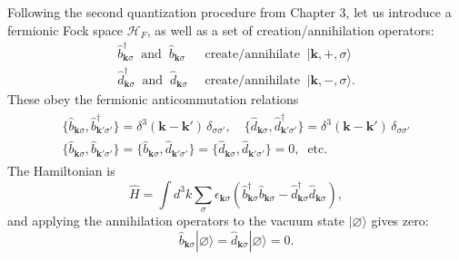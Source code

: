 \documentclass[pra,12pt]{revtex4}
\begin{document}
Following the second quantization procedure from Chapter 3, let us
introduce a fermionic Fock space $\mathscr{H}_F$, as well as a set of
creation/annihilation operators:
\begin{align*}
  \hat{b}_{\mathbf{k}\sigma}^\dagger \;\; \mathrm{and} \;\; \hat{b}_{\mathbf{k}\sigma}
  &\;\;\mathrm{create/annihilate} \;\; |\mathbf{k}, +, \sigma\rangle\\
  \hat{d}_{\mathbf{k}\sigma}^\dagger \;\; \mathrm{and} \;\; \hat{d}_{\mathbf{k}\sigma}
  &\;\;\mathrm{create/annihilate} \;\; |\mathbf{k}, -, \sigma\rangle.
\end{align*}
These obey the fermionic anticommutation relations
\begin{align}
  \begin{aligned}
    \{\hat{b}_{\mathbf{k}\sigma}, \hat{b}_{\mathbf{k}'\sigma'}^\dagger \}
    = \delta^3(\mathbf{k}-\mathbf{k}') \, \delta_{\sigma\sigma'}, \quad
    \{\hat{d}_{\mathbf{k}\sigma}, \hat{d}_{\mathbf{k}'\sigma'}^\dagger \}
    = \delta^3(\mathbf{k}-\mathbf{k}') \, \delta_{\sigma\sigma'} \\
    \{\hat{b}_{\mathbf{k}\sigma}, \hat{b}_{\mathbf{k}'\sigma'} \} = 
    \{\hat{b}_{\mathbf{k}\sigma}, \hat{d}_{\mathbf{k}'\sigma'} \} = 
    \{\hat{d}_{\mathbf{k}\sigma}, \hat{d}_{\mathbf{k}'\sigma'} \} = 0, \;\;\textrm{etc.}
  \end{aligned}
  \label{Diracanticommutation0}
\end{align}
The Hamiltonian is
\begin{equation}
  \hat{H} = \int d^3k \sum_\sigma \epsilon_{\mathbf{k}\sigma} \left(
  \hat{b}^\dagger_{\mathbf{k}\sigma} \hat{b}_{\mathbf{k}\sigma}
  - \hat{d}^\dagger_{\mathbf{k}\sigma} \hat{d}_{\mathbf{k}\sigma}
  \right),
  \label{HDiracQFT0}
\end{equation}
and applying the annihilation operators to the vacuum state
$|\varnothing\rangle$ gives zero:
\begin{equation}
  \hat{b}_{\mathbf{k}\sigma} |\varnothing\rangle =
  \hat{d}_{\mathbf{k}\sigma} |\varnothing\rangle = 0.
\end{equation}
\end{document}

